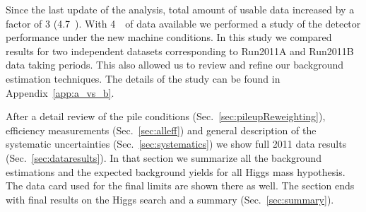 Since the last update of the analysis, total amount of usable data
increased by a factor of 3 (4.7~\ifb{}). With 4~\ifb\ of data
available we performed a study of the detector performance under the
new machine conditions. In this study we compared results for two
independent datasets corresponding to Run2011A and Run2011B data
taking periods. This also allowed us to review and refine our
background estimation techniques. The details of the study can be
found in Appendix~\ref{app:a_vs_b}.

After a detail review of the pile conditions
(Sec.~\ref{sec:pileupReweighting}), efficiency measurements
(Sec.~\ref{sec:alleff}) and general description of the systematic
uncertainties (Sec.~\ref{sec:systematics}) we show full 2011 data
results (Sec.~\ref{sec:dataresults}). In that section we summarize all
the background estimations and the expected background yields for all
Higgs mass hypothesis. The data card used for the final limits are
shown there as well. The section ends with final results on the Higgs
search and a summary (Sec.~\ref{sec:summary}).
